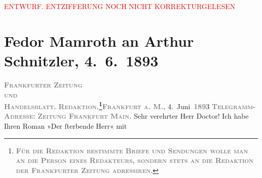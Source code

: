 
\begin{center}
            \textcolor{red}{ENTWURF. ENTZIFFERUNG NOCH NICHT KORREKTURGELESEN}
                      \end{center}
            
               \section[Fedor Mamroth an Arthur Schnitzler, 4. 6. 1893]{ Fedor Mamroth an Arthur Schnitzler, 4. 6. 1893}\nopagebreak{}\rehead{ }\begin{ledgroupsized}[t]{13cm}\normalsize\beginnumbering{} \toendnotes[C]{\smallbreak\pagebreak[2]} 
\toendnotes[C]{\smallbreak}\pstart
           \noindent{}{\pb}\textcolor{gray}{\textbf{\textsc{Frankfurter Zeitung}}}{\\}\textsc{\textcolor{gray}{\textbf{und}}}{\\}\textcolor{gray}{\textbf{\textsc{Handelsblatt.}}}\pend
           \pstart
           \textcolor{gray}{\textbf{\textsc{Redaktion.\footnote{\noindent{}\textcolor{gray}{\textbf{\textsc{Für die Redaktion bestimmte
                                                  Briefe und Sendungen wolle man  an die Person eines
                                                  Redakteurs, sondern stets \textbf{an die
                                                  Redaktion der Frankfurter Zeitung}
                                                  adressiren}}}.}}}}\hfill \textcolor{gray}{\textbf{\textsc{Frankfurt a. M.,}}}{ }4. Juni \textsc{\textcolor{gray}{\textbf{189}}}3\pend
           \pstart
           \textcolor{gray}{\textbf{\textsc{Telegramm-Adresse:}}}\pend
           \pstart
           \textcolor{gray}{\textbf{\textsc{Zeitung Frankfurt Main.}}}\pend
           \pstart{}Sehr verehrter Herr Doctor!\pend\pstart
           Ich habe Ihren Roman »Der ſterbende Herr« mit

\end{ledgroupsized}
